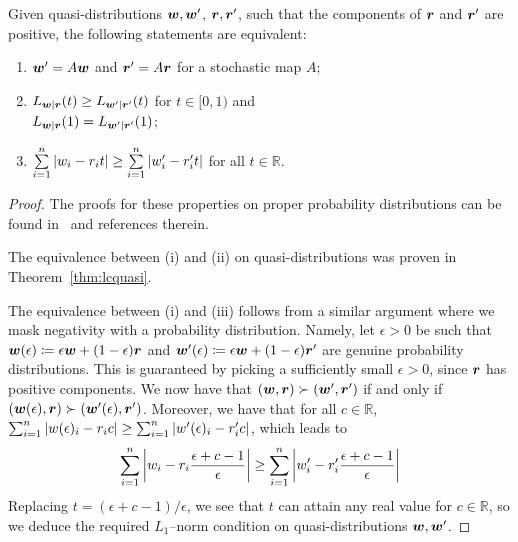 \documentclass[pra,
aps,
twocolumn,
superscriptaddress,
groupedaddress,
nofootinbib,
reprint
]{revtex4-1}
\begin{document}
\begin{proposition}\label{prop:rmajor}
Given quasi-distributions $\boldsymbol{w}, \boldsymbol{w}'$, $\boldsymbol{r} , \boldsymbol{r}'$, such that the components of $\boldsymbol{r}$ and $\boldsymbol{r}'$ are positive, the following statements are equivalent:
  \begin{enumerate}
    \item[(i)] $\boldsymbol{w}' = A\boldsymbol{w}$ and $\boldsymbol{r}' = A\boldsymbol{r}$ for a stochastic map $A$;
    \item[(ii)] $L_{\boldsymbol{w}|\boldsymbol{r}}(t) \geq L_{\boldsymbol{w}'|\boldsymbol{r}'}(t)$ for $t\in [0,1)$ and \vspace{5pt}\\ $L_{\boldsymbol{w}|\boldsymbol{r}}(1) = L_{\boldsymbol{w}'|\boldsymbol{r}'}(1)$;
    \item[(iii)] $\sum\limits_{i=1}^n \abs{w_i - r_i t} \geq \sum\limits_{i=1}^n \abs{w'_i - r'_i t}$ for all $t \in \mathbb{R}$.
  \end{enumerate}
\end{proposition}
\begin{proof}
	The proofs for these properties on proper probability distributions can be found in~\cite{cit:marshall,ruch_mixing_1978,Renes_2016,Buscemi_2017} and references therein.
	
	The equivalence between (i) and (ii) on quasi-distributions was proven in Theorem~\ref{thm:lcquasi}.
	
	The equivalence between (i) and (iii) follows from a similar argument where we mask negativity with a probability distribution.
	Namely, let $\epsilon > 0$ be such that $\boldsymbol{w}(\epsilon) \coloneqq \epsilon \boldsymbol{w} + (1-\epsilon) \boldsymbol{r}$ and $\boldsymbol{w}'(\epsilon) \coloneqq \epsilon \boldsymbol{w} + (1-\epsilon) \boldsymbol{r}'$ are genuine probability distributions. This is guaranteed by picking a sufficiently small $\epsilon > 0$, since $\boldsymbol{r}$ has positive components. We now have that $(\boldsymbol{w} , \boldsymbol{r}) \succ (\boldsymbol{w}', \boldsymbol{r}')$ if and only if $(\boldsymbol{w}(\epsilon) , \boldsymbol{r}) \succ (\boldsymbol{w}'(\epsilon), \boldsymbol{r}')$.
	Moreover, we have that for all $c \in \mathbb{R}$, $\sum_{i=1}^n \abs{w(\epsilon)_i - r_i c} \geq \sum_{i=1}^n \abs{w'(\epsilon)_i - r'_i c}$, which leads to
	\begin{align*}
		\sum\limits_{i=1}^n \abs{w_i - r_i \frac{\epsilon + c - 1}{\epsilon}} \geq \sum\limits_{i=1}^n \abs{w'_i - r'_i \frac{\epsilon + c - 1}{\epsilon}}
	\end{align*}
Replacing $t = (\epsilon + c - 1)/\epsilon$, we see that $t$ can attain any real value for $c \in \mathbb{R}$, so we deduce the required $L_1$--norm condition on quasi-distributions $\boldsymbol{w}, \boldsymbol{w}'$.
\end{proof}
\end{document}
